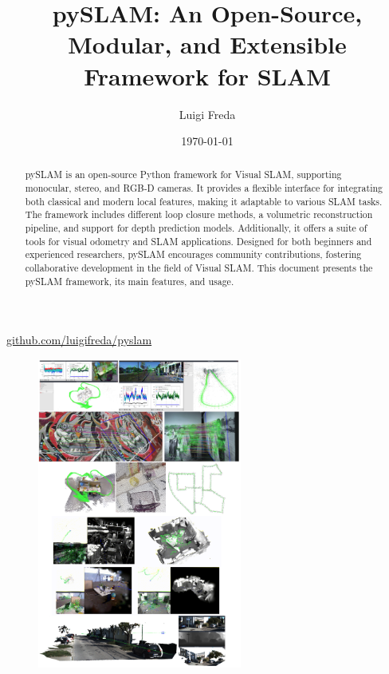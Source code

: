 \documentclass{article}
\title{pySLAM: An Open-Source, Modular, and Extensible Framework for SLAM}
\author{Luigi Freda}
\date{\small \today}  %
\begin{document}
\maketitle
\begin{center}
  \href{https://github.com/luigifreda/pyslam}{github.com/luigifreda/pyslam}
\end{center}

\begin{abstract}
pySLAM is an open-source Python framework for Visual SLAM, supporting monocular, stereo, and RGB-D cameras. It provides a flexible interface for integrating both classical and modern local features, making it adaptable to various SLAM tasks. The framework includes different loop closure methods, a volumetric reconstruction pipeline, and support for depth prediction models. Additionally, it offers a suite of tools for visual odometry and SLAM applications. Designed for both beginners and experienced researchers, pySLAM encourages community contributions, fostering collaborative development in the field of Visual SLAM. This document presents the pySLAM framework, its main features, and usage.
\end{abstract}

\begin{figure}[htbp]
  \centering
  \includegraphics[width=0.6\textwidth]{images_tex/pyslam-teaser-rect.png}
  \label{fig:teaser}
\end{figure}
\end{document}
